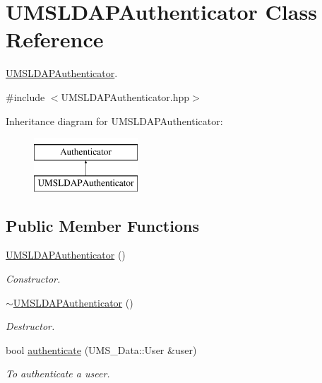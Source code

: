 \hypertarget{classUMSLDAPAuthenticator}{
\section{UMSLDAPAuthenticator Class Reference}
\label{classUMSLDAPAuthenticator}
}


\hyperlink{classUMSLDAPAuthenticator}{UMSLDAPAuthenticator}.  




{\ttfamily \#include $<$UMSLDAPAuthenticator.hpp$>$}

Inheritance diagram for UMSLDAPAuthenticator:\begin{figure}[H]
\begin{center}
\leavevmode
\includegraphics[height=2.000000cm]{classUMSLDAPAuthenticator}
\end{center}
\end{figure}
\subsection*{Public Member Functions}
\begin{DoxyCompactItemize}
\item 
\hypertarget{classUMSLDAPAuthenticator_a610486634e97bb2e0851de33695f1ef9}{
\hyperlink{classUMSLDAPAuthenticator_a610486634e97bb2e0851de33695f1ef9}{UMSLDAPAuthenticator} ()}
\label{classUMSLDAPAuthenticator_a610486634e97bb2e0851de33695f1ef9}

\begin{DoxyCompactList}\small\item\em Constructor. \item\end{DoxyCompactList}\item 
\hypertarget{classUMSLDAPAuthenticator_ab4dcb1f849e4f07a06da9603c2ab3f9b}{
\hyperlink{classUMSLDAPAuthenticator_ab4dcb1f849e4f07a06da9603c2ab3f9b}{$\sim$UMSLDAPAuthenticator} ()}
\label{classUMSLDAPAuthenticator_ab4dcb1f849e4f07a06da9603c2ab3f9b}

\begin{DoxyCompactList}\small\item\em Destructor. \item\end{DoxyCompactList}\item 
bool \hyperlink{classUMSLDAPAuthenticator_acce3532f53d0b97cb1791bb7be5e39ba}{authenticate} (UMS\_\-Data::User \&user)
\begin{DoxyCompactList}\small\item\em To authenticate a useer. \item\end{DoxyCompactList}\end{DoxyCompactItemize}


